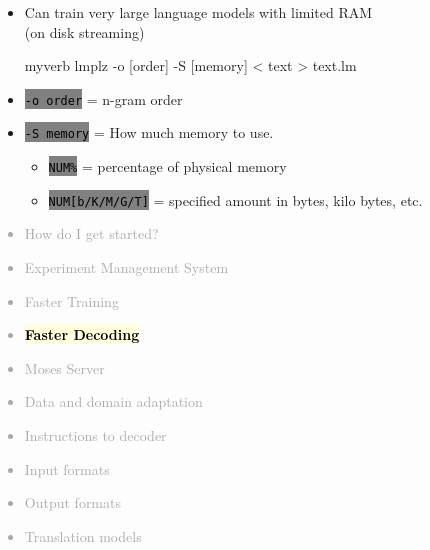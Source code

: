 \documentclass[landscape]{uedslides2C}
\newcommand{\currenttopic}[1]{\colorbox{lightyellow}{\textcolor{black}{\bf #1}}}
\newcommand{\littlecode}[1]{\colorbox{gray}{\textcolor{black}{\small \tt #1}}}
\begin{document}
\vspace{5mm}
\begin{itemize}
\item Can train very large language models with limited RAM\\
(on disk streaming)\\[5mm]
\begin{SaveVerbatim}{myverb} 
lmplz -o [order] -S [memory] < text > text.lm
\end{SaveVerbatim}
\colorbox{gray}{}

\item \littlecode{-o order} = n-gram order
\item \littlecode{-S memory} = How much memory to use.
	      \begin{itemize}
		\item \littlecode{NUM\%} = percentage of physical memory \vspace{2mm}
		\item \littlecode{NUM[b/K/M/G/T]} = specified amount in bytes, kilo bytes, etc.
	      \end{itemize}
\end{itemize}



\vspace{-5mm}
\textcolor{darkgrey}{
\begin{itemize} \itemsep -1mm
\item {How do I get started?}
\item {Experiment Management System}
\item {Faster Training}
\item \currenttopic{Faster Decoding}
\item {Moses Server}
\item {Data and domain adaptation}
\item {Instructions to decoder}
\item {Input formats}
\item {Output formats}
\item {Translation models}
\end{itemize}
}

\end{document}
